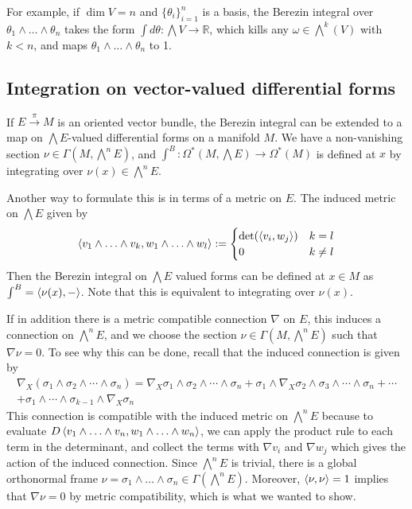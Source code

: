 For example, if $\dim V = n$ and $\{\theta_i\}_{i=1}^n$ is a basis, the
Berezin integral over $\theta_1\wedge\ldots\wedge \theta_n$ takes the form 
$\int d\theta : \bigwedge V \to \mathbb{R}$, 
which kills any $\omega\in \bigwedge^k(V)$ with  $k<n$, and maps 
 $\theta_1\wedge \ldots\wedge\theta_n$ to 1.

\subsection{Integration on vector-valued differential forms} 
\label{section:berezin_forms}
If $E\xrightarrow{\pi} M$ is an oriented vector bundle, the Berezin integral
can be extended to a map on $\bigwedge E$-valued differential forms on a 
manifold $M$. We have a
non-vanishing section  $\nu\in \Gamma(M,\bigwedge^n E)$, and 
$\int^B : \Omega^*(M,\bigwedge E) \to \Omega^*(M)$ is defined at $x$ by
integrating over $\nu(x)\in \bigwedge^n E$. 

Another way to formulate this is in terms of a metric on $E$. The induced
metric on  $\bigwedge E$ given by 
\[
	\gen{v_1\wedge\ldots\wedge v_k, w_1\wedge\ldots\wedge w_l} 
	:= 
	\begin{cases}
		\det(\gen{v_i,w_j})	& k=l \\
		0 & k \neq l
	\end{cases}
\] 
Then the Berezin integral on $\bigwedge E$ valued forms can be defined at $x\in
M$ as $\int^B = \gen{\nu(x),-}$. Note that this is equivalent to integrating over 
$\nu(x)$. 

If in addition there is a metric compatible connection $\nabla$ on $E$, this 
induces a connection on $\bigwedge^n E$, and we choose the section
$\nu\in\Gamma(M,\bigwedge^n E)$ such that $\nabla \nu = 0$. 
To see why this can be done, recall that the induced connection is given by
\begin{multline*}
	\nabla_X(\sigma_1\wedge\sigma_2\wedge\cdots\wedge\sigma_n) 
	= \nabla_X \sigma_1
\wedge \sigma_2 \wedge \cdots \wedge \sigma_n + \sigma_1 \wedge \nabla_X\sigma_2
\wedge \sigma_3 \wedge \cdots \wedge \sigma_n + \cdots \\
+ \sigma_1 \wedge \cdots \wedge \sigma_{k-1}\wedge \nabla_X \sigma_n
\end{multline*}
This connection is compatible with the induced metric on $\bigwedge^nE$ because
to evaluate $D \gen{v_1\wedge\ldots\wedge v_n,w_1\wedge\ldots\wedge w_n}$, 
we can apply the product rule to each term in the determinant, and collect the
terms with $\nabla v_i$ and $\nabla w_j$ which gives the action of the induced
connection. Since $\bigwedge^n E$ is trivial, there is a global orthonormal
frame  $\nu=\sigma_1\wedge\ldots\wedge\sigma_n \in \Gamma(\bigwedge^nE)$. 
Moreover, $\gen{\nu,\nu}=1$ implies that $\nabla \nu = 0$ by metric
compatibility, which is what we wanted to show.

